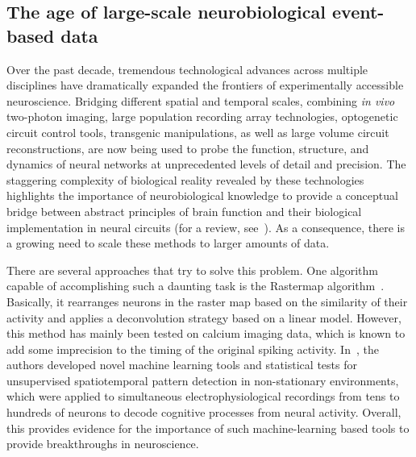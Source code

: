 \documentclass[runningheads]{llncs}
\begin{document}
\subsection{The age of large-scale neurobiological event-based data}
% 
Over the past decade, tremendous technological advances across multiple disciplines have dramatically expanded the frontiers of experimentally accessible neuroscience. Bridging different spatial and temporal scales, combining \textit{in vivo} two-photon imaging, large population recording array technologies, optogenetic circuit control tools, transgenic manipulations, as well as large volume circuit reconstructions, are now being used to probe the function, structure, and dynamics of neural networks at unprecedented levels of detail and precision. The staggering complexity of biological reality revealed by these technologies highlights the importance of neurobiological knowledge to provide a conceptual bridge between abstract principles of brain function and their biological implementation in neural circuits (for a review, see~\cite{grimaldi_precise_2022}). As a consequence, there is a growing need to scale these methods to larger amounts of data. 

There are several approaches that try to solve this problem. One algorithm capable of accomplishing such a daunting task is the Rastermap algorithm~\cite{pachitariu_robustness_2018}. Basically, it rearranges neurons in the raster map based on the similarity of their activity and applies a deconvolution strategy based on a linear model. However, this method has mainly been tested on calcium imaging data, which is known to add some imprecision to the timing of the original spiking activity. In~\cite{russo_cell_2017}, the authors developed novel machine learning tools and statistical tests for unsupervised spatiotemporal pattern detection in non-stationary environments, which were applied to simultaneous electrophysiological recordings from tens to hundreds of neurons to decode cognitive processes from neural activity. Overall, this provides evidence for the importance of such machine-learning based tools to provide breakthroughs in neuroscience.
\end{document}
